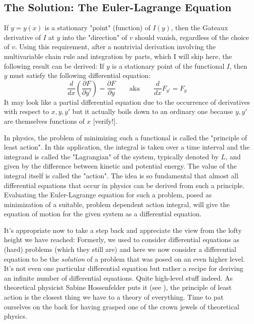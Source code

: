 \subsection{The Solution: The Euler-Lagrange Equation}
If $y = y(x)$ is a stationary "point" (function) of $I(y)$, then the Gateaux derivative of $I$ at $y$ into the "direction" of $v$ should vanish, regardless of the choice of $v$. Using this requirement, after a nontrivial derivation involving the multivariable chain rule and integration by parts, which I will skip here, the following result can be derived: If $y$ is a stationary point of the functional $I$, then $y$ must satisfy the following differential equation:
\begin{equation}
 \frac{d}{d x} \left(  \frac{\partial F}{\partial y'}  \right) = \frac{\partial F}{\partial y}
 \qquad \text{aka} \qquad
 \frac{d}{d x} F_{y'} = F_{y}
\end{equation}
It may look like a partial differential equation due to the occurrence of derivatives with respect to $x,y,y'$ but it actually boils down to an ordinary one because $y,y'$ are themselves functions of $x$ [verify!].

\medskip
In physics, the problem of minimizing such a functional is called the "principle of least action". In this application, the integral is taken over a time interval and the integrand is called the "Lagrangian" of the system, typically denoted by $L$, and given by the difference between kinetic and potential energy. The value of the integral itself is called the "action". The idea is so fundamental that almost all differential equations that occur in physics can be derived from such a principle. Evaluating the Euler-Lagrange equation for such a problem, posed as minimization of a suitable, problem dependent action integral, will give the equation of motion for the given system as a differential equation.

\medskip
It's appropriate now to take a step back and appreciate the view from the lofty height we have reached:  Formerly, we used to consider differential equations as (hard) problems (which they still are) and here we now consider a differential equation to be the \emph{solution} of a problem that was posed on an even higher level. It's not even one particular differential equation but rather a recipe for deriving an infinite number of differential equations. Quite high-level stuff indeed. As theoretical physicist Sabine Hossenfelder puts it (see \cite{YT_LeastAction}), the principle of least action is the closest thing we have to a theory of everything. Time to pat ourselves on the back for having grasped one of the crown jewels of theoretical physics. 


